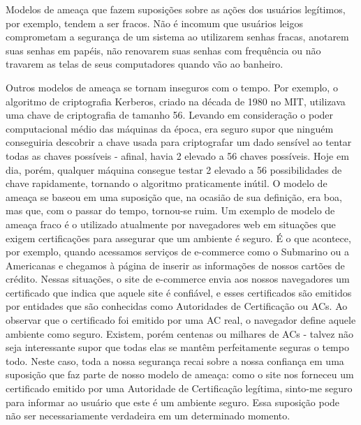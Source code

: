 \documentclass[
	10pt,				%
	openright,			%
	twoside,			%
	a5paper,			%
	english,			%
	french,				%
	spanish,			%
	brazil,				%
	sumario=tradicional
]{abntex2}
\begin{document}
Modelos de ameaça que fazem suposições sobre as ações dos usuários legítimos, por exemplo, tendem a ser fracos. Não é incomum que usuários leigos comprometam a segurança de um sistema ao utilizarem senhas fracas, anotarem suas senhas em papéis, não renovarem suas senhas com frequência ou não travarem as telas de seus computadores quando vão ao banheiro. 

Outros modelos de ameaça se tornam inseguros com o tempo. Por exemplo, o algoritmo de criptografia Kerberos, criado na década de 1980 no MIT, utilizava uma chave de criptografia de tamanho 56. Levando em consideração o poder computacional médio das máquinas da época, era seguro supor que ninguém conseguiria descobrir a chave usada para criptografar um dado sensível ao tentar todas as chaves possíveis - afinal, havia 2 elevado a 56 chaves possíveis. Hoje em dia, porém, qualquer máquina consegue testar 2 elevado a 56 possibilidades de chave rapidamente, tornando o algoritmo praticamente inútil. O modelo de ameaça se baseou em uma suposição que, na ocasião de sua definição, era boa, mas que, com o passar do tempo, tornou-se ruim. Um exemplo de modelo de ameaça fraco é o utilizado atualmente por navegadores web em situações que exigem certificações para assegurar que um ambiente é seguro. É o que acontece, por exemplo, quando acessamos serviços de e-commerce como o Submarino ou a Americanas e chegamos à página de inserir as informações de nossos cartões de crédito. Nessas situações, o site de e-commerce envia aos nossos navegadores um certificado que indica que aquele site é confiável, e esses certificados são emitidos por entidades que são conhecidas como Autoridades de Certificação ou ACs. Ao observar que o certificado foi emitido por uma AC real, o navegador define aquele ambiente como seguro. Existem, porém centenas ou milhares de ACs - talvez não seja interessante supor que todas elas se mantêm perfeitamente seguras o tempo todo. Neste caso, toda a nossa segurança recai sobre a nossa confiança em uma suposição que faz parte de nosso modelo de ameaça: como o site nos forneceu um certificado emitido por uma Autoridade de Certificação legítima, sinto-me seguro para informar ao usuário que este é um ambiente seguro. Essa suposição pode não ser necessariamente verdadeira em um determinado momento. 
\end{document}

